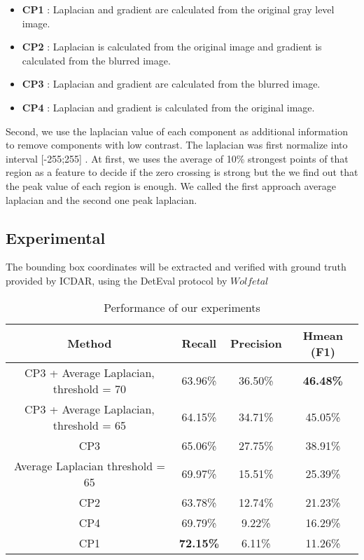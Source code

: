 \begin{itemize}
\item {\textbf{CP1}} : Laplacian and gradient are calculated from the original gray level image.
\item {\textbf{CP2}} : Laplacian is calculated from the original image and gradient is calculated from the blurred image.
\item {\textbf{CP3}} : Laplacian and gradient are calculated from the blurred image.
\item {\textbf{CP4}} : Laplacian  and gradient is calculated from the original image.
\end{itemize}

Second, we use the laplacian value of each component as additional information to remove components with low contrast. The laplacian was first normalize into interval [-255;255] . At first, we uses the average of 10\% strongest points of that region as a feature to decide if the zero crossing is strong but the we find out that the peak value of each region is enough. We called the first approach average laplacian and the second one peak laplacian.

\subsection{Experimental}
The bounding box coordinates will be extracted and verified with ground truth provided by ICDAR, using the DetEval protocol by $Wolf et al$ \cite{WolfIJDAR2006}

\begin {table}[H]
\caption{Performance of our experiments}\label{tab:performanceOur} 
\begin{tabular}{|c|c|c|c|}
\hline 
\textbf{Method} & \textbf{Recall} & \textbf{Precision} & \textbf{Hmean (F1)} \\ 
\hline 
CP3 + Average Laplacian, threshold = 70 & 63.96\% & 36.50\% & \textbf{46.48\%} \\ 
\hline 
CP3 + Average Laplacian, threshold = 65  & 64.15\% & 34.71\% & 45.05\%\\ 
\hline 
CP3 & 65.06\% & 27.75\% & 38.91\% \\ 
\hline
Average Laplacian threshold = 65  & 69.97\% & 15.51\% & 25.39\% \\ 
\hline  
CP2 & 63.78\% & 12.74\% & 21.23\% \\ 
\hline 
CP4 & 69.79\% & 9.22\% & 16.29\% \\ 
\hline 
CP1 &\textbf{ 72.15\%} & 6.11\% & 11.26\% \\ 
\hline 
\end{tabular} 

\end{table}


